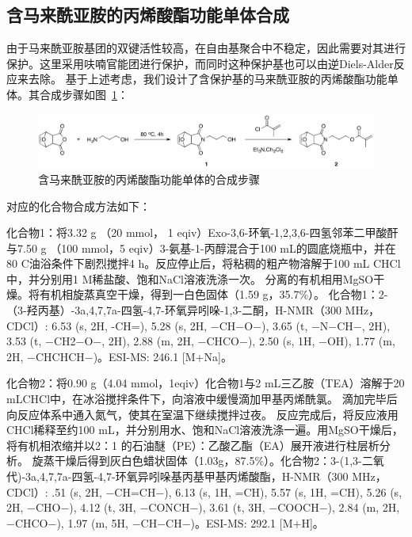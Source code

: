 \subsection{含马来酰亚胺的丙烯酸酯功能单体合成}

由于马来酰亚胺基团的双键活性较高，在自由基聚合中不稳定，因此需要对其进行保护。这里采用呋喃官能团进行保护，而同时这种保护基也可以由逆Diels-Alder反应来去除。
基于上述考虑，我们设计了含保护基的马来酰亚胺的丙烯酸酯功能单体。其合成步骤如图~\ref{fig:maleimide-sync}：
\begin{figure}[htbp]
  \centering
  \includegraphics[width=\linewidth]{figures/ch3/ch3-maleimide-synth.png}
  \caption{含马来酰亚胺的丙烯酸酯功能单体的合成步骤}
  \label{fig:maleimide-sync}
\end{figure}

对应的化合物合成方法如下：

化合物1：将3.32 g （20 mmol， 1 eqiv）Exo-3,6-环氧-1,2,3,6-四氢邻苯二甲酸酐与7.50 g （100 mmol，5 eqiv）3-氨基-1-丙醇混合于100 mL的圆底烧瓶中，并在80 \text{$^\circ$}C油浴条件下剧烈搅拌4 h。反应停止后，将粘稠的粗产物溶解于100 mL CHCl中，并分别用1 M稀盐酸、饱和NaCl溶液洗涤一次。
分离的有机相用MgSO干燥。将有机相旋蒸真空干燥，得到一白色固体（1.59 g，35.7\%）。
化合物1：2-（3-羟丙基）-3a,4,7,7a-四氢-4,7-环氧异吲哚-1,3-二酮，H-NMR（300 MHz，CDCl）: \text{$\delta$} 6.53 (s, 2H, -CH=), 5.28 (s, 2H, −CH−O−), 3.65 (t, −N−CH−, 2H), 3.53 (t, −CH2−O−, 2H), 2.88 (m, 2H, −CHCO−), 2.50 (s, 1H, −OH), 1.77 (m, 2H, −CHCHCH−)。ESI-MS: 246.1 [M+Na]\text{$^+$}。

化合物2：将0.90 g（4.04 mmol，1eqiv）化合物1与2 mL三乙胺（TEA）溶解于20 mLCHCl中，在冰浴搅拌条件下，向溶液中缓慢滴加甲基丙烯酰氯。
滴加完毕后向反应体系中通入氮气，使其在室温下继续搅拌过夜。
反应完成后，将反应液用CHCl稀释至约100 mL，并分别用水、饱和NaCl溶液洗涤一遍。用MgSO干燥后，将有机相浓缩并以2：1 的石油醚（PE）：乙酸乙酯（EA）展开液进行柱层析分析。
旋蒸干燥后得到灰白色蜡状固体（1.03g，87.5\%）。化合物2：3-(1,3-二氧代)-3a,4,7,7a-四氢-4,7-环氧异吲哚基丙基甲基丙烯酸酯，H-NMR（300 MHz，CDCl）:\text{$\delta$} .51 (s, 2H, −CH=CH−), 6.13 (s, 1H, =CH), 5.57 (s, 1H, =CH), 5.26 (s, 2H, −CHO−), 4.12 (t, 3H, −CONCH−), 3.61 (t, 3H, −COOCH−), 2.84 (m, 2H, −CHCO−), 1.97 (m, 5H, −CH−CH−)。ESI-MS: 292.1 [M+H]\text{$^+$}。


